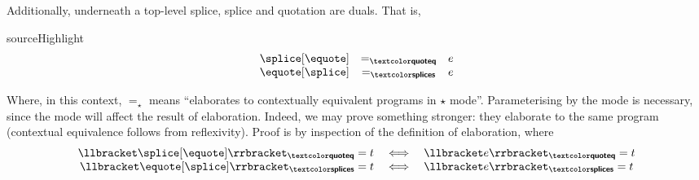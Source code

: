 
Additionally, underneath a top-level splice, splice and quotation are duals. That is, 
\begin{theorem}{sourceHighlight}
\[\begin{array}{rcl}
\splice[{\equote}] & =_{\quotemode{}} & e \\
\equote[{\splice}] & =_{\splicemode{}} & e
\end{array}
\]
\end{theorem}
Where, in this context, $=_{\star}$ means ``elaborates to contextually equivalent \coreLang{} programs in $\star$ mode''. Parameterising by the mode is necessary, since the mode will affect the result of elaboration. Indeed, we may prove something stronger: they elaborate to the same \coreLang{} program (contextual equivalence follows from reflexivity). Proof is by inspection of the definition of elaboration, where
\[\begin{array}{rcl}  
  \elaborate{\splice[{\equote}]}_{\quotemode{}} = t & \iff & \elaborate{e}_{\quotemode{}} = t\\
  \elaborate{\equote[{\splice}]}_{\splicemode{}} = t & \iff & \elaborate{e}_{\splicemode{}} = t
\end{array}
  \]


